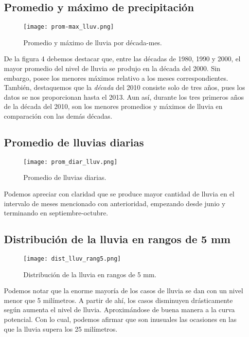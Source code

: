 \documentclass[12pt]{article}
\begin{document}
\subsection{Promedio y máximo de precipitación}

    \begin{figure}[H]
        \centering
        \texttt{[image: prom-max\_lluv.png]}
        \caption{Promedio y máximo de lluvia por década-mes.}
    \end{figure}
    
De la figura 4 debemos destacar que, entre las décadas de 1980, 1990 y 2000, el mayor promedio del nivel de lluvia se produjo en la década del 2000. Sin embargo, posee los menores máximos relativo a los meses correspondientes.\\
También, destaquemos que la \textit{década} del 2010 consiste solo de tres años, pues los datos se nos proporcionan hasta el 2013. Aun así, durante los tres primeros años de la década del 2010, son los menores promedios y máximos de lluvia en comparación con las demás décadas.
\clearpage
\subsection{Promedio de lluvias diarias}

    \begin{figure}[H]
        \centering
        \texttt{[image: prom\_diar\_lluv.png]}
        \caption{Promedio de lluvias diarias.}
    \end{figure}

Podemos apreciar con claridad que se produce mayor cantidad de lluvia en el intervalo de meses mencionado con anterioridad, empezando desde junio y terminando en septiembre-octubre.
\clearpage

\subsection{Distribución de la lluvia en rangos de 5 mm}

\begin{figure}[H]
    \centering
    \texttt{[image: dist\_lluv\_rang5.png]}
    \caption{Distribución de la lluvia en rangos de 5 mm.}
\end{figure}

Podemos notar que la enorme mayoría de los casos de lluvia se dan con un nivel menor que 5 milímetros. A partir de ahí, los casos disminuyen drásticamente según aumenta el nivel de lluvia. Aproximándose de buena manera a la curva potencial. Con lo cual, podemos afirmar que son inusuales las ocasiones en las que la lluvia supera los 25 milímetros.
\clearpage
\end{document}
